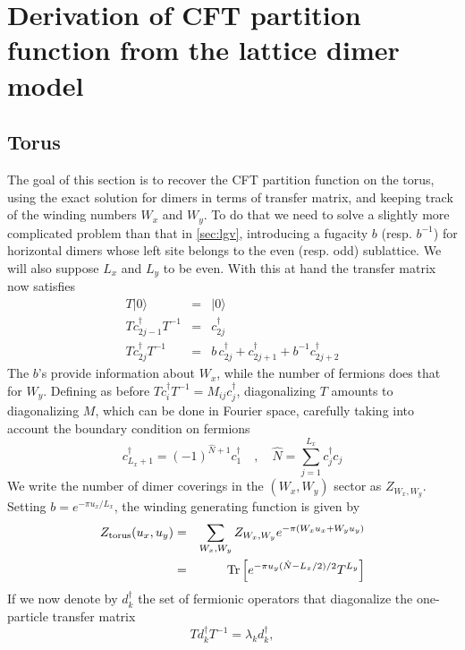 \documentclass[11pt]{iopart}
\begin{document}
\section[\;\;\;\;\;\;\;\;\;\;\;\;\;\;CFT partition functions from the lattice dimer model]{Derivation of CFT partition function from the lattice dimer model}
\label{sec:dimers_exact}
 \subsection[\;\;\;\;\;\;\;\;\;\;\;\;\;\; Torus]{Torus}
The goal of this section is to recover the CFT partition function on the torus, using the exact solution for dimers in terms of transfer matrix, and keeping track of the winding numbers $W_x$ and $W_y$. To do that we need to solve a slightly more complicated problem than that in \ref{sec:lgv}, introducing a fugacity $b$ (resp. $b^{-1}$) for horizontal dimers whose left site belongs to the even (resp. odd) sublattice. We will also suppose $L_x$ and $L_y$ to be even. With this at hand the transfer matrix now satisfies
\begin{eqnarray}
T|0\rangle&=&|0\rangle\\
T c_{2j-1}^\dag T^{-1}&=&c_{2j}^\dag\\
T c_{2j}^\dag T^{-1}&=&b \,c_{2j}^\dag+c_{2j+1}^\dag +b^{-1}c_{2j+2}^\dag
\end{eqnarray}
The $b$'s provide information about $W_x$, while the number of fermions does that for $W_y$. 
Defining as before $T c_i^\dag T^{-1}=M_{ij} c_j^\dag$, diagonalizing $T$ amounts to diagonalizing $M$, which can be done in Fourier space, carefully taking into account the boundary condition on fermions
\begin{equation}
 c_{L_x+1}^\dag=(-1)^{\hat{N}+1}c_1^\dag\quad,\quad \hat{N}=\sum_{j=1}^{L_x} c^\dag_j c_j
\end{equation}
We write the number of dimer coverings in the $(W_x,W_y)$ sector as $Z_{W_x,W_y}$. Setting $b=e^{-\pi u_x/L_x}$, the winding generating function is given by
\begin{eqnarray}
 Z_{\rm torus}(u_x,u_y)&=&\sum_{W_x,W_y} Z_{W_x,W_y}e^{-\pi (W_x u_x+W_y u_y)}\\\label{eq:Z_tm}
 &=&{\rm Tr}\left[\displaystyle{e^{-\pi u_y(\hat{N}-L_x/2)/2}T^{L_y}}\right]
\end{eqnarray}
If we now denote by $d_k^\dag$ the set of fermionic operators that diagonalize the one-particle transfer matrix
\begin{equation}
 T d_k^\dag T^{-1}=\lambda_k d_k^\dag,
\end{equation}
\end{document}
